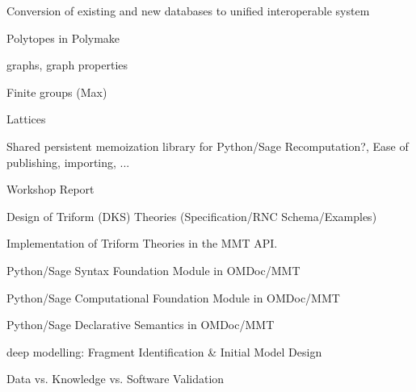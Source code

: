 \begin{workpackage}[id=dksbases,wphases=1-48!.5,
  title=Data/Knowledge/Software-Bases,lead=JU,
  ZHRM=1,JURM=36,USHRM=12,UWRM=3]
\begin{wpdelivs}
  \begin{wpdeliv}[due=12,id=conv,dissem=PU,nature=DEC]
        {Conversion of existing and new databases to unified interoperable system}
     \begin{compactitem}
     \item Polytopes in Polymake
     \item graphs, graph properties
     \item Finite groups (Max)
     \item Lattices
     \end{compactitem}
   \end{wpdeliv}
  \begin{wpdeliv}[due=24,id=persistent-memoization,dissem=PU,nature=O]
    {Shared persistent memoization library for Python/Sage} 
    Recomputation?,  Ease of publishing, importing, ...
  \end{wpdeliv}
  \begin{wpdeliv}[due=9,id=wsrep,dissem=PU,nature=R]{Workshop Report}
  \end{wpdeliv}
  \begin{wpdeliv}[due=12,id=dkstheories,dissem=PU,nature=R]
        {Design of Triform (DKS) Theories (Specification/RNC Schema/Examples)}
  \end{wpdeliv}
  \begin{wpdeliv}[due=24,id=dksimp,dissem=PU,nature=O]
        {Implementation of Triform Theories in the MMT API.}
  \end{wpdeliv}
  \begin{wpdeliv}[due=12,id=pssyntax,dissem=PU,nature=DEC]
        {Python/Sage Syntax Foundation Module in OMDoc/MMT}
  \end{wpdeliv}
  \begin{wpdeliv}[due=24,id=psfoundation,dissem=PU,nature=O]
        {Python/Sage Computational Foundation Module in OMDoc/MMT}
  \end{wpdeliv}
  \begin{wpdeliv}[due=36,id=pssem,dissem=PU,nature=O]
      {Python/Sage Declarative Semantics in OMDoc/MMT}
  \end{wpdeliv}
  \begin{wpdeliv}[due=12,id=lfmmod,dissem=PU,nature=R]
      {\LMFDB deep modelling: Fragment Identification \& Initial Model Design}
  \end{wpdeliv}
  \begin{wpdeliv}[due=18,id=lfmval,dissem=PU,nature=R]
      {\LMFDB Data vs. Knowledge vs. Software Validation}

\end{wpdeliv}
\end{wpdelivs}
\end{workpackage}
